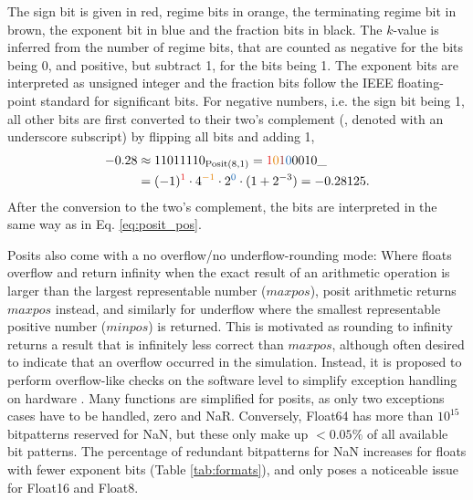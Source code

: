 The sign bit is given in red, regime bits in orange, the terminating regime bit in brown, the exponent bit in blue and the fraction bits in black.
The $k$-value is inferred from the number of regime bits, that are counted as negative for the bits being 0, and positive, but subtract 1,
for the bits being 1. The exponent bits are interpreted as unsigned integer and the fraction bits follow the IEEE floating-point standard
for significant bits. For negative numbers, i.e. the sign bit being 1, all other bits are first converted to their two's complement (\cite{Choo2003},
denoted with an underscore subscript) by flipping all bits and adding 1,
\begin{equation}
\begin{split}
-0.28 &  \approx 11011110_{\op{Posit}(8,1)} = {\color{psign}1}{\color{pregime}0}{\color{pregimet}1}{\color{pexpo}0}0010\_ \\
& = (-1)^{\color{psign}1} \cdot 4^{\color{pregime}-1} \cdot 2^{\color{pexpo}0} \cdot (1+2^{-3}) = -0.28125.
\end{split}
\label{eq:2comp}
\end{equation}
After the conversion to the two's complement, the bits are interpreted in the same way as in Eq. \ref{eq:posit_pos}.

Posits also come with a no overflow/no underflow-rounding mode: Where floats overflow and return infinity when the exact result of an
arithmetic operation is larger than the largest representable number ($maxpos$), posit arithmetic returns $maxpos$ instead, and similarly
for underflow where the smallest representable positive number ($minpos$) is returned. This is motivated as rounding to infinity returns a
result that is infinitely less correct than $maxpos$, although often desired to indicate that an overflow occurred in the simulation.
Instead, it is proposed to perform overflow-like checks on the software level to simplify exception handling on hardware \citep{Gustafson2017a}.
Many functions are simplified for posits, as only two exceptions cases have to be handled, zero and NaR. Conversely, Float64 has more than
$10^{15}$ bitpatterns reserved for NaN, but these only make up $< 0.05\%$ of all available bit patterns. The percentage of redundant
bitpatterns for NaN increases for floats with fewer exponent bits (Table \ref{tab:formats}), and only poses a noticeable issue for Float16
and Float8.

